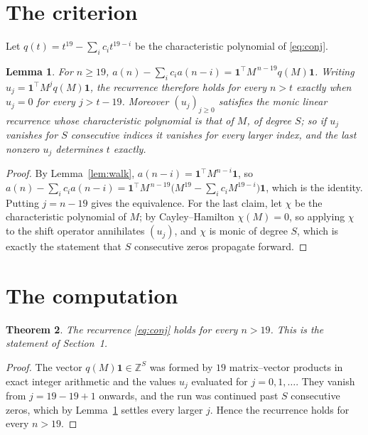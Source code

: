 \documentclass[11pt,a4paper]{article}
\theoremstyle{plain}
\newtheorem{theorem}{Theorem}
\newtheorem{lemma}[theorem]{Lemma}
\theoremstyle{definition}
\begin{document}
\section{The criterion}

Let $q(t)=t^{19}-\sum_i c_i t^{19-i}$ be the characteristic polynomial of
\eqref{eq:conj}.

\begin{lemma}\label{lem:crit}
For $n\ge19$,
$a(n)-\sum_i c_i a(n-i)=\mathbf{1}^{\!\top}M^{\,n-19}q(M)\mathbf{1}$. Writing
$u_j=\mathbf{1}^{\!\top}M^{j}q(M)\mathbf{1}$, the recurrence therefore holds for every
$n>t$ exactly when $u_j=0$ for every $j>t-19$. Moreover $(u_j)_{j\ge0}$ satisfies the
monic linear recurrence whose characteristic polynomial is that of $M$, of degree $S$; so
if $u_j$ vanishes for $S$ consecutive indices it vanishes for every larger index, and the
last nonzero $u_j$ determines $t$ exactly.
\end{lemma}

\begin{proof}
By Lemma~\ref{lem:walk}, $a(n-i)=\mathbf{1}^{\!\top}M^{n-i}\mathbf{1}$, so
$a(n)-\sum_i c_i a(n-i)
=\mathbf{1}^{\!\top}M^{\,n-19}\bigl(M^{19}-\sum_i c_i M^{19-i}\bigr)
\mathbf{1}$, which is the identity. Putting $j=n-19$ gives the equivalence. For the
last claim, let $\chi$ be the characteristic polynomial of $M$; by Cayley--Hamilton
$\chi(M)=0$, so applying $\chi$ to the shift operator annihilates $(u_j)$, and $\chi$ is
monic of degree $S$, which is exactly the statement that $S$ consecutive zeros propagate
forward.
\end{proof}

\section{The computation}

\begin{theorem}
The recurrence \eqref{eq:conj} holds for every $n>19$. This is the statement of
Section~1.
\end{theorem}

\begin{proof}
The vector $q(M)\mathbf{1}\in\mathbb{Z}^{S}$ was formed by $19$ matrix--vector
products in exact integer arithmetic and the values $u_j$ evaluated for
$j=0,1,\dots$. They vanish from $j=19-19+1$ onwards, and the run was continued past
$S$ consecutive zeros, which by Lemma~\ref{lem:crit} settles every larger $j$. Hence the
recurrence holds for every $n>19$.
\end{proof}
\end{document}
